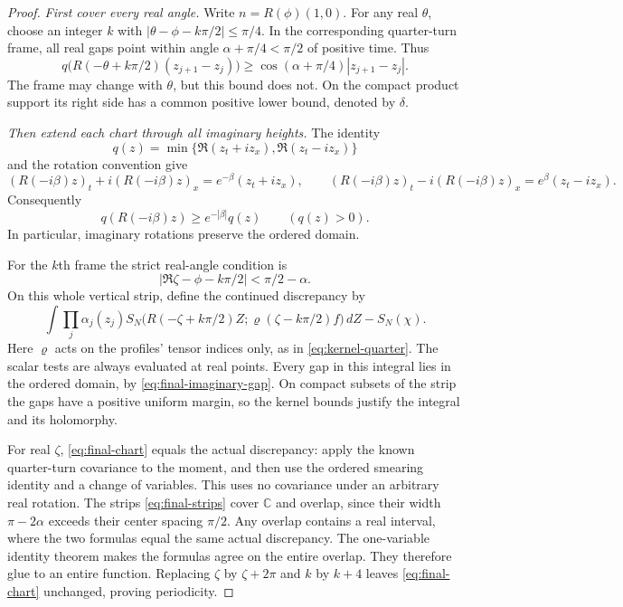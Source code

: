 \documentclass[11pt, letterpaper, reqno]{amsart}
\theoremstyle{definition}
\theoremstyle{remark}
\newcommand{\bbC}{\mathbb{C}}
\begin{document}
\begin{proof}
\emph{First cover every real angle.}
Write $n=R(\phi)(1,0)$. For any real $\theta$, choose an integer $k$ with
$|\theta-\phi-k\pi/2|\le\pi/4$. In the corresponding quarter-turn frame,
all real gaps point within angle $\alpha+\pi/4<\pi/2$ of positive time.
Thus
\begin{equation}\label{eq:final-real-gap}
 q\bigl(R(-\theta+k\pi/2)(z_{j+1}-z_j)\bigr)
 \ge \cos(\alpha+\pi/4)|z_{j+1}-z_j|.
\end{equation}
The frame may change with $\theta$, but this bound does not. On the compact
product support its right side has a common positive lower bound,
denoted by $\delta$.

\emph{Then extend each chart through all imaginary heights.}
The identity
\[
 q(z)=\min\{\Re(z_t+iz_x),\Re(z_t-iz_x)\}
\]
and the rotation convention give
\[
 (R(-i\beta)z)_t+i(R(-i\beta)z)_x=e^{-\beta}(z_t+iz_x),
 \qquad
 (R(-i\beta)z)_t-i(R(-i\beta)z)_x=e^{\beta}(z_t-iz_x).
\]
Consequently
\begin{equation}\label{eq:final-imaginary-gap}
 q(R(-i\beta)z)\ge e^{-|\beta|}q(z)\qquad(q(z)>0).
\end{equation}
In particular, imaginary rotations preserve the ordered domain.

For the $k$th frame the strict real-angle condition is
\begin{equation}\label{eq:final-strips}
 |\Re\zeta-\phi-k\pi/2|<\pi/2-\alpha.
\end{equation}
On this whole vertical strip, define the continued discrepancy by
\begin{equation}\label{eq:final-chart}
 \int\prod_j\alpha_j(z_j)
 S_N\bigl(R(-\zeta+k\pi/2)Z;
              \varrho(\zeta-k\pi/2)f\bigr)\,dZ-S_N(\chi).
\end{equation}
Here $\varrho$ acts on the profiles' tensor indices only, as in
\eqref{eq:kernel-quarter}.
The scalar tests are always evaluated at real points. Every gap in this
integral lies in the ordered domain, by \eqref{eq:final-imaginary-gap}.
On compact subsets of the strip the gaps have a positive uniform margin,
so the kernel bounds justify the integral and its holomorphy.

For real $\zeta$, \eqref{eq:final-chart} equals the actual discrepancy:
apply the known quarter-turn covariance to the moment, and then use the
ordered smearing identity and a change of variables. This uses no
covariance under an arbitrary real rotation.
The strips \eqref{eq:final-strips} cover $\bbC$ and overlap, since
their width $\pi-2\alpha$ exceeds their center spacing $\pi/2$.
Any overlap contains a real interval, where the two formulas equal the
same actual discrepancy. The one-variable identity theorem makes the
formulas agree on the entire overlap. They therefore glue to an entire
function. Replacing $\zeta$ by $\zeta+2\pi$ and $k$ by $k+4$ leaves
\eqref{eq:final-chart} unchanged, proving periodicity.


\end{proof}
\end{document}
